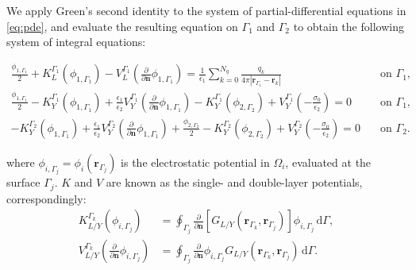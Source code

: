 

We apply Green's second identity to the system of partial-differential equations in \eqref{eq:pde}, and evaluate the resulting equation on $\Gamma_1$ and $\Gamma_2$ to obtain the following system of integral equations:
%
\begin{widetext}
\begin{align} \label{eq:integral_eq}
\frac{\phi_{1,\Gamma_1}}{2}+ K_{L}^{\Gamma_1}(\phi_{1,\Gamma_1}) -  V_{L}^{\Gamma_1} \left(\frac{\partial}{\partial \mathbf{n}}\phi_{1,\Gamma_1} \right)  =  
\frac{1}{\epsilon_1} \sum_{k=0}^{N_q} \frac{q_k}{4\pi|\mathbf{r}_{\Gamma_1} - \mathbf{r}_k|} &  \quad \text{on $\Gamma_1$,} \nonumber \\ 
\frac{\phi_{1,\Gamma_1}}{2} - K_{Y}^{\Gamma_1}(\phi_{1,\Gamma_1}) +  \frac{\epsilon_1}{\epsilon_2} V_{Y}^{\Gamma_1} \left( \frac{\partial}{\partial \mathbf{n}} \phi_{1,\Gamma_1} \right) -  
K_{Y}^{\Gamma_1}(\phi_{2,\Gamma_2})  + V_{Y}^{\Gamma_1} \left( -\frac{\sigma_0}{\epsilon_2} \right)  = 0& \quad \text{on $\Gamma_1$,} \nonumber \\ 
- K_{Y}^{\Gamma_2}(\phi_{1,\Gamma_1}) + \frac{\epsilon_1}{\epsilon_2} V_{Y}^{\Gamma_2}  \left( \frac{\partial}{\partial \mathbf{n}} \phi_{1,\Gamma_1} \right) + \frac{\phi_{2,\Gamma_2}}{2} - 
K_{Y}^{\Gamma_2}(\phi_{2,\Gamma_2}) +  V_{Y}^{\Gamma_2} \left( -\frac{\sigma_0}{\epsilon_2} \right)  = 0& \quad \text{on $\Gamma_2$.}
\end{align}
\end{widetext}


\noindent where $\phi_{i,\Gamma_j} = \phi_i(\mathbf{r}_{\Gamma_j})$ is the electrostatic potential in $\Omega_i$, evaluated at the surface $\Gamma_j$. 
$K$ and $V$ are known as the single- and double-layer potentials, correspondingly:
%
\begin{align} \label{eq:layers}
K_{L/Y}^{\Gamma_k}(\phi_{i,\Gamma_j}) &= \oint_{\Gamma_j} \frac{\partial}{\partial \mathbf{n}} \left[ G_{L/Y}(\mathbf{r}_{\Gamma_k},\mathbf{r}_{\Gamma_j}) \right]\phi_{i,\Gamma_j} \, \mathrm{d} \Gamma, \nonumber \\
V_{L/Y}^{\Gamma_k} \left( \frac{\partial}{\partial \mathbf{n}} \phi_{i,\Gamma_j} \right) &= \oint_{\Gamma_j} \frac{\partial}{\partial \mathbf{n}} \phi_{i,\Gamma_j} G_{L/Y}(\mathbf{r}_{\Gamma_k},\mathbf{r}_{\Gamma_j})  \, \mathrm{d} \Gamma.
\end{align}

